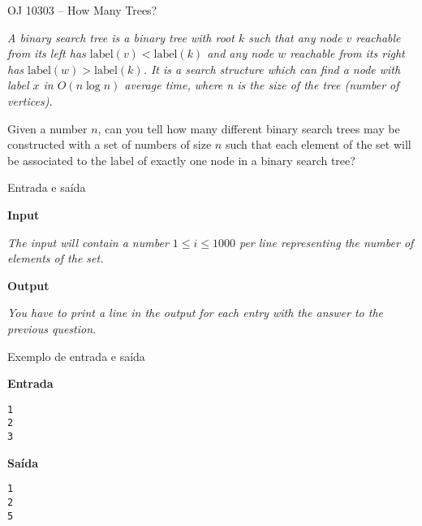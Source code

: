 \begin{frame}[fragile]{OJ 10303 -- How Many Trees?}

{\it
A binary search tree is a binary tree with root $k$ such that any node $v$ reachable from its left has
$\mathrm{label}(v) < \mathrm{label}(k)$ and any node $w$ reachable from its right has $\mathrm{label}(w) > \mathrm{label}(k)$. It is a search
structure which can find a node with label $x$ in $O(n\log n)$ average time, where n is the size of the tree
(number of vertices).

Given a number $n$, can you tell how many different binary search trees may be constructed with a
set of numbers of size $n$ such that each element of the set will be associated to the label of exactly one
node in a binary search tree?
}

\end{frame}

\begin{frame}[fragile]{Entrada e saída}

\textbf{Input}

{\it The input will contain a number $1 \leq i \leq 1000$ per line representing the number of elements of the set.}


\vspace{0.3in}


\textbf{Output}

{\it You have to print a line in the output for each entry with the answer to the previous question.}

\end{frame}

\begin{frame}[fragile]{Exemplo de entrada e saída}

\begin{minipage}[t]{0.45\textwidth}
\textbf{Entrada}
\begin{verbatim}
1
2
3
\end{verbatim}
\end{minipage}
\begin{minipage}[t]{0.5\textwidth}
\textbf{Saída}
\begin{verbatim}
1
2
5
\end{verbatim}
\end{minipage}

\end{frame}


